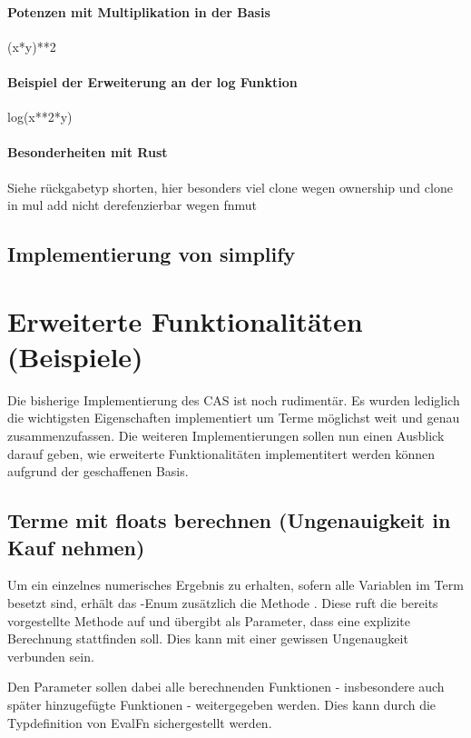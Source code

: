 \documentclass[11pt,a4paper, ngerman]{article}
\begin{document}
\paragraph{Potenzen mit Multiplikation in der Basis} (x*y)**2

\paragraph{Beispiel der Erweiterung an der log Funktion} log(x**2*y)

\paragraph{Besonderheiten mit Rust} Siehe rückgabetyp shorten, hier besonders viel clone wegen ownership und clone in mul add nicht derefenzierbar wegen fnmut

\subsection{Implementierung von simplify}

\newpage

\section{Erweiterte Funktionalitäten (Beispiele)}
Die bisherige Implementierung des CAS ist noch rudimentär. Es wurden lediglich die wichtigsten Eigenschaften implementiert um Terme möglichst weit und genau zusammenzufassen.
Die weiteren Implementierungen sollen nun einen Ausblick darauf geben, wie erweiterte Funktionalitäten implementitert werden können aufgrund der geschaffenen Basis. 

\subsection{Terme mit floats berechnen (Ungenauigkeit in Kauf nehmen)} Um ein einzelnes numerisches Ergebnis zu erhalten, sofern alle Variablen im Term besetzt sind, erhält das -Enum zusätzlich die Methode . Diese ruft die bereits vorgestellte Methode  auf und übergibt als Parameter, dass eine explizite Berechnung stattfinden soll. Dies kann mit einer gewissen Ungenaugkeit verbunden sein.

Den Parameter  sollen dabei alle berechnenden Funktionen - insbesondere auch später hinzugefügte Funktionen - weitergegeben werden. Dies kann durch die Typdefinition von EvalFn sichergestellt werden.
\end{document}
